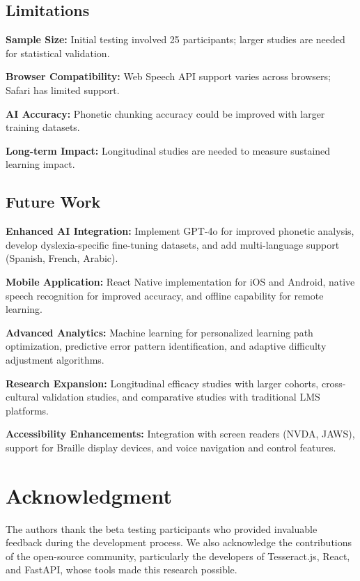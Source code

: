 \documentclass[journal]{IEEEtran}
\begin{document}
\subsection{Limitations}

\textbf{Sample Size:} Initial testing involved 25 participants; larger studies are needed for statistical validation.

\textbf{Browser Compatibility:} Web Speech API support varies across browsers; Safari has limited support.

\textbf{AI Accuracy:} Phonetic chunking accuracy could be improved with larger training datasets.

\textbf{Long-term Impact:} Longitudinal studies are needed to measure sustained learning impact.

\subsection{Future Work}

\textbf{Enhanced AI Integration:} Implement GPT-4o for improved phonetic analysis, develop dyslexia-specific fine-tuning datasets, and add multi-language support (Spanish, French, Arabic).

\textbf{Mobile Application:} React Native implementation for iOS and Android, native speech recognition for improved accuracy, and offline capability for remote learning.

\textbf{Advanced Analytics:} Machine learning for personalized learning path optimization, predictive error pattern identification, and adaptive difficulty adjustment algorithms.

\textbf{Research Expansion:} Longitudinal efficacy studies with larger cohorts, cross-cultural validation studies, and comparative studies with traditional LMS platforms.

\textbf{Accessibility Enhancements:} Integration with screen readers (NVDA, JAWS), support for Braille display devices, and voice navigation and control features.

\section*{Acknowledgment}

The authors thank the beta testing participants who provided invaluable feedback during the development process. We also acknowledge the contributions of the open-source community, particularly the developers of Tesseract.js, React, and FastAPI, whose tools made this research possible.
\end{document}
